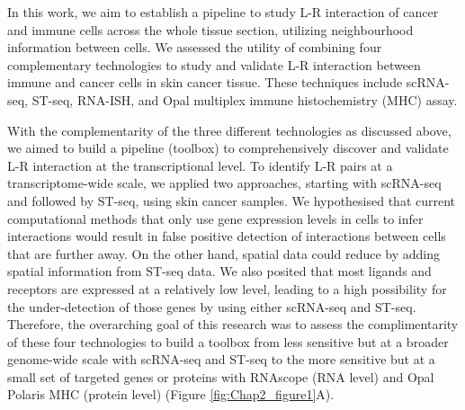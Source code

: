 In this work, we aim to establish a pipeline to study L-R interaction of cancer and immune cells across the whole tissue section, utilizing neighbourhood information between cells. We assessed the utility of combining four complementary technologies to study and validate L-R interaction between immune and cancer cells in skin cancer tissue. These techniques include scRNA-seq, ST-seq, RNA-ISH, and Opal multiplex immune histochemistry (MHC) assay. 

With the complementarity of the three different technologies as discussed above, we aimed to build a pipeline (toolbox) to comprehensively discover and validate L-R interaction at the transcriptional level. To identify L-R pairs at a transcriptome-wide scale, we applied two approaches, starting with scRNA-seq and followed by ST-seq, using skin cancer samples. We hypothesised that current computational methods that only use gene expression levels in cells to infer interactions would result in false positive detection of interactions between cells that are further away. On the other hand, spatial data could reduce by adding spatial information from ST-seq data. We also posited that most ligands and receptors are expressed at a relatively low level, leading to a high possibility for the under-detection of those genes by using either scRNA-seq and ST-seq. Therefore, the overarching goal of this research was to assess the complimentarity of these four technologies to build a toolbox from less sensitive but at a broader genome-wide scale with scRNA-seq and ST-seq to the more sensitive but at a small set of targeted genes or proteins with RNAscope (RNA level) and Opal Polaris MHC (protein level) (Figure \ref{fig:Chap2_figure1}A). 

